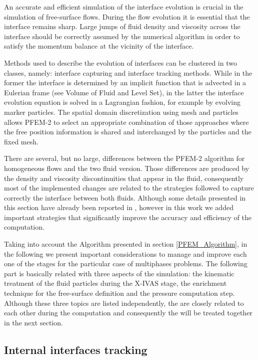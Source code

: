 An accurate and efficient simulation of the interface evolution is crucial in the simulation of free-surface flows. During the flow evolution it is essential that the interface remains sharp. Large jumps of fluid density and viscosity across the interface should be correctly assumed by the numerical algorithm in order to satisfy the momentum balance at the vicinity of the interface.

Methods used to describe the evolution of interfaces can be clustered in two classes, namely: interface capturing and interface tracking methods. While in the former the interface is determined by an implicit function that is advected in a Eulerian frame (see Volume of Fluid \cite{VoF} and Level Set\cite{Osher01}), in the latter the interface evolution equation is solved in a Lagrangian fashion, for example by evolving marker particles. The spatial domain discretization using mesh and particles allows PFEM-2 to select an appropriate combination of those approaches where the free position information is shared and interchanged by the particles and the fixed mesh.

There are several, but no large, differences between the PFEM-2 algorithm for homogeneous flows and the two fluid version. Those differences are produced by the density and viscosity discontinuities that appear in the fluid, consequently most of the implemented changes are related to the strategies followed to capture correctly the interface between both fluids. Although some details presented in this section have already been reported in \cite{Idelsohn13c}, however in this work we added important strategies that significantly improve the accuracy and efficiency of the computation.

Taking into account the Algorithm presented in section \ref{PFEM_Algorithm}, in the following we present important considerations to manage and improve each one of the stages for the particular case of multiphases problems. The following part is basically related with three aspects of the simulation: the kinematic treatment of the fluid particles during the X-IVAS stage, the enrichment technique for the free-surface definition and the pressure computation step. Although these three topics are listed independently, the are closely related to each other during the computation and consequently the will be treated together in the next section.

\subsection{Internal interfaces tracking}

